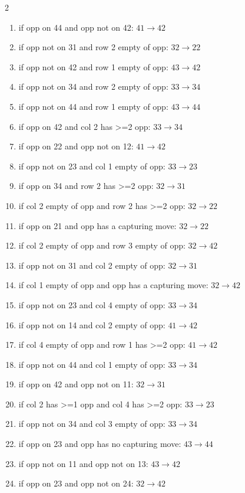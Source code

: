 \begin{multicols}{2}
\begin{tikzpicture}[scale=0.24]
\end{tikzpicture}
\nopagebreak\begin{enumerate}[topsep=1pt,itemsep=0pt,parsep=0pt,leftmargin=2.2em,label=\arabic*.]
\item if opp on 44 and opp not on 42: $41\!\to\!42$
\item if opp not on 31 and row 2 empty of opp: $32\!\to\!22$
\item if opp not on 42 and row 1 empty of opp: $43\!\to\!42$
\item if opp not on 34 and row 2 empty of opp: $33\!\to\!34$
\item if opp not on 44 and row 1 empty of opp: $43\!\to\!44$
\item if opp on 42 and col 2 has >=2 opp: $33\!\to\!34$
\item if opp on 22 and opp not on 12: $41\!\to\!42$
\item if opp not on 23 and col 1 empty of opp: $33\!\to\!23$
\item if opp on 34 and row 2 has >=2 opp: $32\!\to\!31$
\item if col 2 empty of opp and row 2 has >=2 opp: $32\!\to\!22$
\item if opp on 21 and opp has a capturing move: $32\!\to\!22$
\item if col 2 empty of opp and row 3 empty of opp: $32\!\to\!42$
\item if opp not on 31 and col 2 empty of opp: $32\!\to\!31$
\item if col 1 empty of opp and opp has a capturing move: $32\!\to\!42$
\item if opp not on 23 and col 4 empty of opp: $33\!\to\!34$
\item if opp not on 14 and col 2 empty of opp: $41\!\to\!42$
\item if col 4 empty of opp and row 1 has >=2 opp: $41\!\to\!42$
\item if opp not on 44 and col 1 empty of opp: $33\!\to\!34$
\item if opp on 42 and opp not on 11: $32\!\to\!31$
\item if col 2 has >=1 opp and col 4 has >=2 opp: $33\!\to\!23$
\item if opp not on 34 and col 3 empty of opp: $33\!\to\!34$
\item if opp on 23 and opp has no capturing move: $43\!\to\!44$
\item if opp not on 11 and opp not on 13: $43\!\to\!42$
\item if opp on 23 and opp not on 24: $32\!\to\!42$

\end{enumerate}
\end{multicols}
